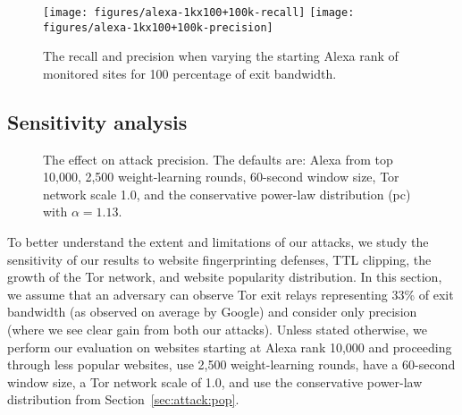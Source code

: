 \begin{figure}[t]
\centering
\texttt{[image: figures/alexa-1kx100+100k-recall]}
\texttt{[image: figures/alexa-1kx100+100k-precision]}
\caption{The recall and precision when varying the starting Alexa rank of
monitored sites for 100 percentage of exit bandwidth.}
\label{fig:fpt:alexa}
\end{figure}

\subsection{Sensitivity analysis}

\begin{figure}[t]
\centering
{}
\caption{The effect on attack precision. The defaults are: Alexa from top 10,000,
2,500 weight-learning rounds,
60-second window size, Tor network scale 1.0, and the conservative
power-law distribution (pc) with $\alpha=1.13$.}
\label{fig:fpt:var}
\end{figure}

To better understand the extent and limitations of our attacks, we
study the sensitivity of our results to website fingerprinting defenses,
TTL clipping, the growth of the Tor network, and website popularity
distribution.  In this section, we assume that an adversary can observe Tor
exit relays representing 33\% of exit bandwidth (as observed on average
by Google) and consider only precision (where we see clear gain from both our
attacks).  Unless stated otherwise, we perform our evaluation on
websites starting at Alexa rank 10,000 and proceeding through less
popular websites, use 2,500 weight-learning rounds, have a 60-second window
size, a Tor network scale of 1.0, and use the conservative power-law
distribution from Section~\ref{sec:attack:pop}.



